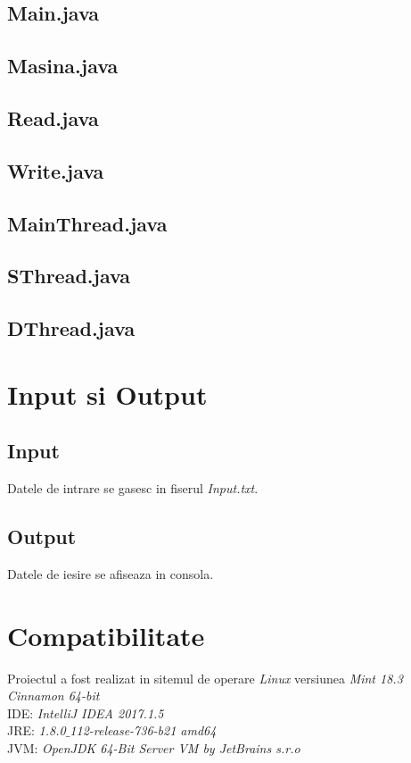 \documentclass{article}
\begin{document}
\subsection{Main.java}

\newpage

\subsection{Masina.java}

\newpage

\subsection{Read.java}

\newpage

\subsection{Write.java}

\newpage

\subsection{MainThread.java}

\newpage

\subsection{SThread.java}

\newpage

\subsection{DThread.java}

\newpage

\section{Input si Output}

\subsection{Input}
Datele de intrare se gasesc in fiserul \textit{Input.txt}.


\subsection{Output}
Datele de iesire se afiseaza in consola.


\newpage
\section{Compatibilitate}
Proiectul a fost realizat in sitemul de operare \textit{Linux} versiunea \textit{Mint 18.3 Cinnamon 64-bit}
\\IDE: \textit{IntelliJ IDEA 2017.1.5}
\\JRE: \textit{1.8.0$\_$112-release-736-b21 amd64}
\\JVM: \textit{OpenJDK 64-Bit Server VM by JetBrains s.r.o}
\end{document}
